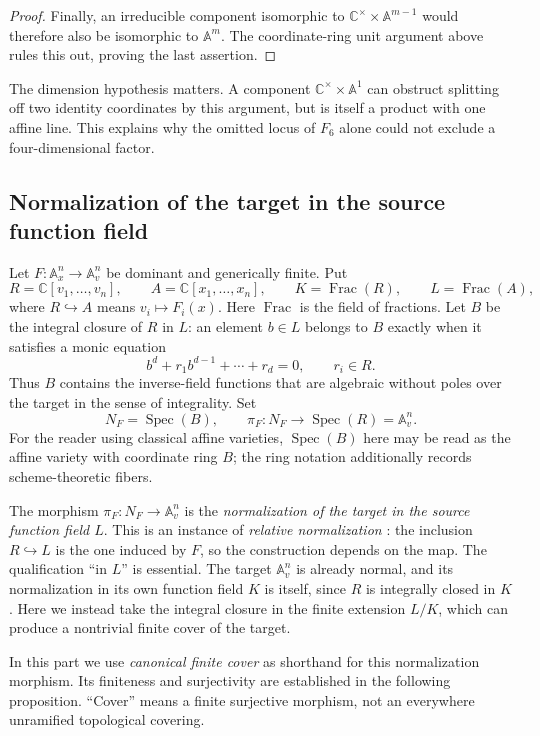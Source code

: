 \documentclass[11pt]{article}
\numberwithin{equation}{section}
\theoremstyle{plain}
\theoremstyle{definition}
\theoremstyle{remark}
\newcommand{\C}{\mathbb{C}}
\newcommand{\A}{\mathbb{A}}
\begin{document}
\begin{proof}
Finally, an irreducible component isomorphic to
$\C^\times\times\A^{m-1}$ would therefore also be isomorphic to
$\A^m$. The coordinate-ring unit argument above rules this out,
proving the last assertion.
\end{proof}

The dimension hypothesis matters. A component $\C^\times\times\A^1$
can obstruct splitting off two identity coordinates by this argument,
but is itself a product with one affine line. This explains why the
omitted locus of $F_6$ alone could not exclude a four-dimensional factor.

\subsection{Normalization of the target in the source function field}\label{prod:sec:finite}
Let $F:\A^n_x\to\A^n_v$ be dominant and generically finite. Put
\[
 R=\C[v_1,\ldots,v_n],\qquad A=\C[x_1,\ldots,x_n],\qquad
 K=\operatorname{Frac}(R),\qquad L=\operatorname{Frac}(A),
\]
where $R\hookrightarrow A$ means $v_i\mapsto F_i(x)$. Here
$\operatorname{Frac}$ is the field of fractions. Let $B$ be the integral
closure of $R$ in $L$: an element $b\in L$ belongs to $B$ exactly when
it satisfies a monic equation
\[
 b^d+r_1b^{d-1}+\cdots+r_d=0,\qquad r_i\in R.
\]
Thus $B$ contains the inverse-field functions that are algebraic without
poles over the target in the sense of integrality. Set
\[
 N_F=\operatorname{Spec}(B),\qquad
 \pi_F:N_F\longrightarrow\operatorname{Spec}(R)=\A^n_v.
\]
For the reader using classical affine varieties, $\operatorname{Spec}(B)$
here may be read as the affine variety with coordinate ring $B$; the ring
notation additionally records scheme-theoretic fibers.

The morphism $\pi_F:N_F\to\A^n_v$ is the \emph{normalization of the
target in the source function field $L$}. This is an instance of
\emph{relative normalization} \cite{StacksRelativeNormalization}: the
inclusion $R\hookrightarrow L$ is the one induced by $F$, so the
construction depends on the map. The qualification ``in $L$'' is essential.
The target $\A^n_v$ is already normal, and its normalization in its own
function field $K$ is itself, since $R$ is integrally closed in $K$.
Here we instead take the integral closure in the finite extension $L/K$,
which can produce a nontrivial finite cover of the target.

In this part we use \emph{canonical finite cover} as shorthand for this
normalization morphism. Its finiteness and surjectivity are established
in the following proposition. ``Cover'' means a finite surjective morphism,
not an everywhere unramified topological covering.
\end{document}
